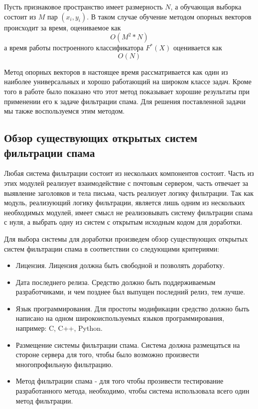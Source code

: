 Пусть признаковое пространство имеет размерность $N$, а обучающая выборка состоит из $M$ пар $(x_i, y_i)$. В таком случае обучение методом опорных векторов происходит за время, оцениваемое как
\begin{equation}
O(M^2*N)
\end{equation}
а время работы построенного классификатора $F^*(X)$ оценивается как 
\begin{equation}
O(N)
\end{equation}

Метод опорных векторов в настоящее время рассматривается как один из наиболее универсальных и хорошо работающий на широком классе задач. Кроме того в работе\cite{ROZ} было показано что этот метод показывает хорошие результаты при применении его к задаче фильтрации спама. Для решения поставленной задачи мы также воспользуемся этим методом.

\subsection{Обзор существующих открытых систем фильтрации спама}
Любая система фильтрации состоит из нескольких компонентов состоит. Часть из этих модулей реализует взаимодействие с почтовым сервером, часть отвечает за выявление заголовков и тела письма, часть реализует логику фильтрации. Так как модуль, реализующий логику фильтрации, является лишь одним из нескольких необходимых модулей, имеет смысл не реализовывать систему фильтрации спама с нуля, а выбрать одну из систем с открытым исходным кодом для доработки.

Для выбора системы для доработки произведем обзор существующих открытых систем фильтрации спама в соответствии со следующими критериями:
\begin{itemize}
\item Лицензия. Лицензия должна быть свободной и позволять доработку.
\item Дата последнего релиза. Средство должно быть поддерживаемым разработчиками, и чем позднее был выпущен последний релиз, тем лучше.
\item Язык программирования. Для простоты модификации средство должно быть написано на одном широкоиспользуемых языков программирования, например: C, C++, Python.
\item Размещение системы фильтрации спама. Система должна размещаться на стороне сервера для того, чтобы было возможно произвести многопрофильную фильтрацию. 
\item Метод фильтрации спама - для того чтобы прозивести тестирование разработанного метода, необходимо, чтобы система использовала всего один метод фильтрации.
\end{itemize}

